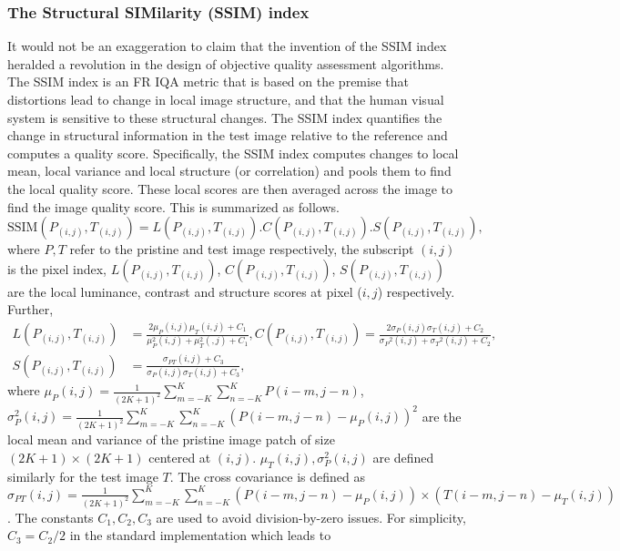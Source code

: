 \documentclass{article}
\begin{document}
\subsubsection{The Structural SIMilarity (SSIM) index}
\label{sssec:ssim}
It would not be an exaggeration to claim that the invention of the SSIM index \cite{wang2004image} heralded a revolution in the design of objective quality assessment algorithms. The SSIM index is an FR IQA metric that is based on the premise that distortions lead to change in local image structure, and that the human visual system is sensitive to these structural changes. The SSIM index quantifies the change in structural information in the test image relative to the reference and computes a quality score. Specifically, the SSIM index computes changes to local mean, local variance and local structure (or correlation) and pools them to find the local quality score. These local scores are then averaged across the image to find the image quality score. This is summarized as follows.
\begin{equation}
\text{SSIM}(P_{(i, j)}, T_{(i, j)}) = L(P_{(i, j)}, T_{(i, j)}).C(P_{(i, j)}, T_{(i, j)}).S(P_{(i, j)}, T_{(i, j)}),
    \label{eqn:local_ssim}
\end{equation}
where $P, T$ refer to the pristine and test image respectively, the subscript $(i, j)$ is the pixel index, $L(P_{(i, j)}, T_{(i, j)})$, $C(P_{(i, j)}, T_{(i, j)})$, $S(P_{(i, j)}, T_{(i, j)})$ are the local luminance, contrast and structure scores at pixel ($i, j$) respectively. Further,
\begin{equation}
\begin{split}
    L(P_{(i, j)}, T_{(i, j)}) &= \frac{2\mu_{P}(i, j)\mu_{T}(i,j)+C_{1}}{\mu_{P}^{2}(i, j)+\mu_{T}^{2}(, j)+C_{1}},
    C(P_{(i, j)}, T_{(i, j)}) = \frac{2\sigma_{P}(i, j)\sigma_{T}(i, j)+C_{2}}{{\sigma_{P}}^{2}(i, j)+{\sigma_{T}}^{2}(i, j)+C_{2}},\\
   S(P_{(i, j)}, T_{(i, j)}) &= \frac{\sigma_{PT}(i, j)+C_{3}}{\sigma_{P}(i, j)\sigma_{T}(i, j)+C_{3}},
   \end{split}
   \label{eqn:lcs}
\end{equation}
where
$\mu_{P}(i, j) = \frac{1}{(2K+1)^2}\sum\limits_{m=-K}^K\sum\limits_{n=-K}^KP(i-m, j - n)$, $\sigma^2_P(i, j) = \frac{1}{(2K+1)^2}\sum\limits_{m=-K}^K\sum\limits_{n=-K}^K(P(i-m, j - n) - \mu_{P}(i, j))^2$ are the local mean and variance of the pristine image patch of size $(2K+1)\times(2K+1)$ centered at $(i, j)$. $\mu_{T}(i, j), \sigma^2_P(i, j)$ are defined similarly for the test image $T$. The cross covariance is defined as $\sigma_{PT}(i, j) = \frac{1}{(2K+1)^2}\sum\limits_{m=-K}^K\sum\limits_{n=-K}^K(P(i-m, j - n) - \mu_{P}(i, j))\times(T(i-m, j - n) - \mu_{T}(i, j))$. The constants $C_1, C_2, C_3$ are used to avoid division-by-zero issues. For simplicity, $C_3 = C_2/2$ in the standard implementation which leads to 
\end{document}
